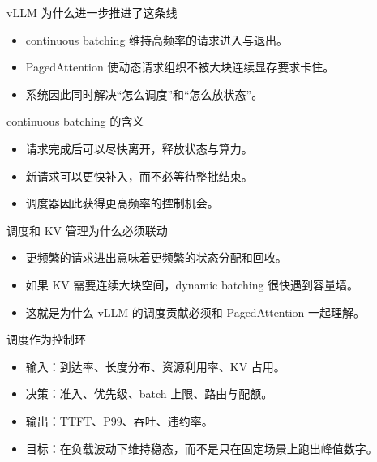 \begin{frame}{vLLM 为什么进一步推进了这条线}
  \begin{itemize}
    \item continuous batching 维持高频率的请求进入与退出。
    \item PagedAttention 使动态请求组织不被大块连续显存要求卡住。
    \item 系统因此同时解决“怎么调度”和“怎么放状态”。
  \end{itemize}
\end{frame}

\begin{frame}{continuous batching 的含义}
  \begin{itemize}
    \item 请求完成后可以尽快离开，释放状态与算力。
    \item 新请求可以更快补入，而不必等待整批结束。
    \item 调度器因此获得更高频率的控制机会。
  \end{itemize}
\end{frame}

\begin{frame}{调度和 KV 管理为什么必须联动}
  \begin{itemize}
    \item 更频繁的请求进出意味着更频繁的状态分配和回收。
    \item 如果 KV 需要连续大块空间，dynamic batching 很快遇到容量墙。
    \item 这就是为什么 vLLM 的调度贡献必须和 PagedAttention 一起理解。
  \end{itemize}
\end{frame}

\begin{frame}{调度作为控制环}
  \begin{itemize}
    \item 输入：到达率、长度分布、资源利用率、KV 占用。
    \item 决策：准入、优先级、batch 上限、路由与配额。
    \item 输出：TTFT、P99、吞吐、违约率。
    \item 目标：在负载波动下维持稳态，而不是只在固定场景上跑出峰值数字。
  \end{itemize}
\end{frame}


